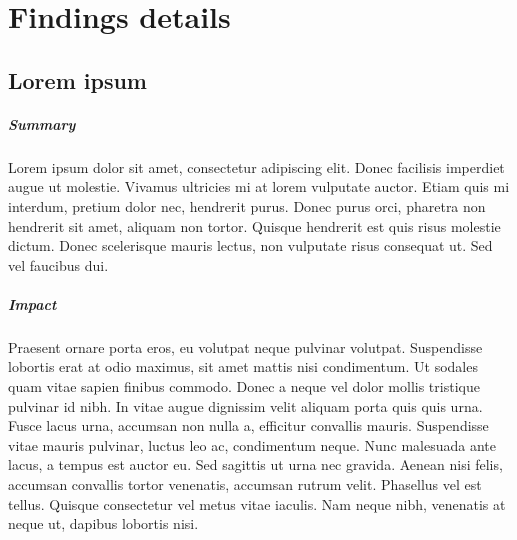 \chapter{Findings details}

\section{\makecvssbadge Lorem ipsum}

\makecvssbox

\paragraph{Summary} Lorem ipsum dolor sit amet, consectetur adipiscing elit. Donec facilisis imperdiet augue ut molestie. Vivamus ultricies mi at lorem vulputate auctor. Etiam quis mi interdum, pretium dolor nec, hendrerit purus. Donec purus orci, pharetra non hendrerit sit amet, aliquam non tortor. Quisque hendrerit est quis risus molestie dictum. Donec scelerisque mauris lectus, non vulputate risus consequat ut. Sed vel faucibus dui.

\paragraph{Impact}
Praesent ornare porta eros, eu volutpat neque pulvinar volutpat. Suspendisse lobortis erat at odio maximus, sit amet mattis nisi condimentum. Ut sodales quam vitae sapien finibus commodo. Donec a neque vel dolor mollis tristique pulvinar id nibh. In vitae augue dignissim velit aliquam porta quis quis urna. Fusce lacus urna, accumsan non nulla a, efficitur convallis mauris. Suspendisse vitae mauris pulvinar, luctus leo ac, condimentum neque. Nunc malesuada ante lacus, a tempus est auctor eu. Sed sagittis ut urna nec gravida. Aenean nisi felis, accumsan convallis tortor venenatis, accumsan rutrum velit. Phasellus vel est tellus. Quisque consectetur vel metus vitae iaculis. Nam neque nibh, venenatis at neque ut, dapibus lobortis nisi. 

